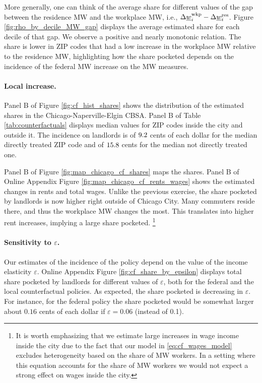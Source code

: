 More generally, one can think of the average share for different values of the 
gap between the residence MW and the workplace MW, i.e., 
$\Delta \underline{w}_i^{\text{wkp}} - \Delta \underline{w}_i^{\text{res}}$.
Figure \ref{fig:rho_by_decile_MW_gap} displays the average estimated share for 
each decile of that gap.
We observe a positive and nearly monotonic relation.
The share is lower in ZIP codes that had a low increase in the workplace MW 
relative to the residence MW, highlighting how the share pocketed depends on
the incidence of the federal MW increase on the MW measures.

\paragraph{Local increase.}

Panel B of Figure \ref{fig:cf_hist_shares} shows the distribution of the 
estimated shares in the Chicago-Naperville-Elgin CBSA.
Panel B of Table \ref{tab:counterfactuals} displays median values for ZIP codes
inside the city and outside it.
The incidence on landlords is of $\textnormal{9.2}$ cents of each 
dollar for the median directly treated ZIP code and of 
$\textnormal{15.8}$ cents for the median not directly treated one.

Panel B of Figure \ref{fig:map_chicago_cf_shares} maps the shares.
Panel B of Online Appendix Figure \ref{fig:map_chicago_cf_rents_wages} shows the 
estimated changes in rents and total wages.
Unlike the previous exercise, the share pocketed by landlords is now higher 
right outside of Chicago City.
Many commuters reside there, and thus the workplace MW changes the most.
This translates into higher rent increases, implying a large share pocketed.%
\footnote{It is worth emphasizing that we estimate large increases in wage income
inside the city due to the fact that our model in \eqref{eq:cf_wages_model}
excludes heterogeneity based on the share of MW workers.
In a setting where this equation accounts for the share of MW workers we would 
not expect a strong effect on wages inside the city.} 

\paragraph{Sensitivity to $\varepsilon$.}

Our estimates of the incidence of the policy depend on the value of the
income elasticity $\varepsilon$.
Online Appendix Figure \ref{fig:cf_share_by_epsilon} displays total share 
pocketed by landlords for different values of $\varepsilon$, both for the 
federal and the local counterfactual policies.
As expected, the share pocketed is decreasing in $\varepsilon$.
For instance, for the federal policy the share pocketed would be somewhat 
larger about $0.16$ cents of each dollar if $\varepsilon = 0.06$ 
(instead of 0.1).

